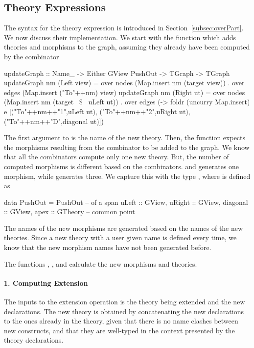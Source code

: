\subsection{Theory Expressions}
The syntax for the theory expression is introduced in Section~\ref{subsec:overPart}. We now discuss their implementation. 
We start with the function  which adds theories and morphisms to the graph, assuming they already have been computed by the combinator
\begin{hscode}
updateGraph ::   Name_ -> Either GView PushOut -> TGraph -> TGraph
updateGraph nm (Left view) =
  over nodes (Map.insert nm (target view)) .
  over edges (Map.insert ("To"++nm) view)
updateGraph nm (Right ut) =
  over nodes (Map.insert nm (target ~$\$$~ uLeft ut)) .
  over edges (\e -> foldr (uncurry Map.insert) e 
                        [("To"++nm++"1",uLeft ut),
                         ("To"++nm++"2",uRight ut),
                         ("To"++nm++"D",diagonal ut)])
\end{hscode}
The first argument to  is the name of the new theory. Then, the function expects the morphisms resulting from the combinator to be added to the graph. We know that all the combinators compute only one new theory. 
But, the number of computed morphisms is different based on the combinators.  and  generates one morphism, while  generates three. We capture this with the type , where  is defined as 
\begin{hscode}
data PushOut = PushOut { -- of a span
  uLeft    :: GView,
  uRight   :: GView,
  diagonal :: GView,
  apex     :: GTheory } -- common point
\end{hscode}
The names of the new morphisms are generated based on the names of the new theories. Since a new theory with a user given name is defined every time, we know that the new morphism names have not been generated before. 

The functions , , and  calculate the new morphisms and theories. 

\paragraph{1. Computing Extension}
The inputs to the extension operation is the theory being extended and the new declarations. The new theory is obtained by concatenating the new declarations to the ones already in the theory, given that there is no name clashes between new constructs, and that they are well-typed in the context presented by the theory declarations. 

